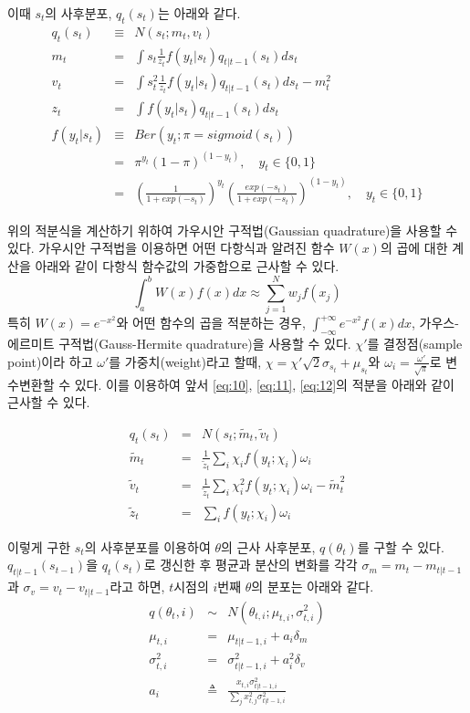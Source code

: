 \documentclass[oneside,b5paper,11pt]{book}
\theoremstyle{plain}
\theoremstyle{definition}
\theoremstyle{remark}
\theoremstyle{definition}
\numberwithin{equation}{chapter}
\begin{document}
이때 $s_t$의 사후분포, $q_t(s_t)$는 아래와 같다.
\begin{eqnarray}
q_t(s_t) &\equiv& N(s_t; m_t, v_t)
\\ m_t &=& \int s_t \frac{1}{z_t} f(y_t|s_t) q_{t|t-1}(s_t)ds_t \label{eq:10}
\\ v_t &=& \int s^2_t \frac{1}{z_t} f(y_t|s_t) q_{t|t-1}(s_t) ds_t - m_t^2 \label{eq:11}
\\ z_t &=& \int f(y_t|s_t) q_{t|t-1}(s_t)ds_t \label{eq:12}
\\ f(y_t|s_t) &\equiv& Ber(y_t;\pi = sigmoid(s_t))
\\ & =& \pi^{y_t} (1-\pi)^{(1-y_t)}, \quad y_t \in \{0,1\}
\\ & =& \left(\frac{1}{1+exp(-s_t)}\right)^{y_t} \left(\frac{exp(-s_t)}{1+exp(-s_t)}\right)^{(1-y_t)}, \quad y_t \in \{0,1\} \nonumber
\end{eqnarray}

위의 적분식을 계산하기 위하여 가우시안 구적법(Gaussian quadrature)을 사용할 수 있다. 가우시안 구적법을 이용하면 어떤 다항식과 알려진 함수 $W(x)$의 곱에 대한 계산을 아래와 같이 다항식 함수값의 가중합으로 근사할 수 있다.
$$\int^b_a W(x)f(x)dx \approx \sum^N_{j=1}w_j f(x_j)$$
특히 $W(x)=e^{-x^2}$와 어떤 함수의 곱을 적분하는 경우, $\int^{+\infty}_{-\infty}e^{-x^2}f(x)dx$, 가우스-에르미트 구적법(Gauss-Hermite quadrature)을 사용할 수 있다. $\chi'$를 결정점(sample point)이라 하고 $\omega'$를 가중치(weight)라고 할때,  $\chi=\chi'\sqrt{2}\sigma_{s_t}+\mu_{s_t}$와 $\omega_i = \frac{\omega'}{\sqrt{\pi}}$로 변수변환할 수 있다. 이를 이용하여 앞서 \ref{eq:10}, \ref{eq:11}, \ref{eq:12}의 적분을 아래와 같이 근사할 수 있다.\citep{Zoeter2007}

\begin{eqnarray}
q_t(s_t) &=& N(s_t; \tilde{m}_t, \tilde{v}_t)
\\ \tilde{m}_t &=& \frac{1}{\tilde{z}_t} \sum_i \chi_i f(y_t; \chi_i ) \omega_i
\\ \tilde{v}_t &=& \frac{1}{\tilde{z}_t} \sum_i \chi^2_i f(y_t; \chi_i ) \omega_i - \tilde{m}^2_t
\\ \tilde{z}_t &=& \sum_i f(y_t; \chi_i ) \omega_i
\end{eqnarray}

이렇게 구한 $s_t$의 사후분포를 이용하여 $\theta$의 근사 사후분포,  $q(\theta_t)$를 구할 수 있다. $q_{t|t-1}(s_{t-1})$을 $q_{t}(s_t)$로 갱신한 후 평균과 분산의 변화를 각각 $\sigma_m = m_t - m_{t|t-1}$과 $\sigma_v = v_t - v_{t|t-1}$라고 하면, $t$시점의 $i$번째 $\theta$의 분포는 아래와 같다.\citep{Murphy2012}
\begin{eqnarray}
   q(\theta_t,i) &\sim& N(\theta_{t,i};\mu_{t,i}, \sigma^2_{t,i})
\\ \mu_{t,i} &=& \mu_{t|t-1,i} + a_i \delta_m
\\ \sigma^2_{t,i} &=& \sigma^2_{t|t-1,i} + a^2_i \delta_v
\\ a_i &\triangleq& \frac{x_{t,i}\sigma^2_{t|t-1,i}}{\sum_j x^2_{t,j}\sigma^2_{t|t-1,i}}
\end{eqnarray}
\end{document}

